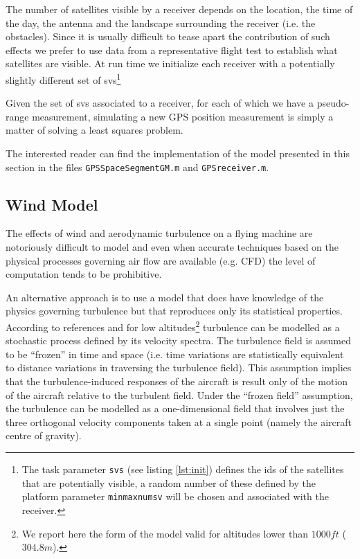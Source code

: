 \documentclass[a4paper,11pt]{report}
\begin{document}
The number of satellites visible by a receiver depends on the location, the time of the day, the antenna and the landscape surrounding the receiver (i.e. the obstacles). Since it is usually difficult to tease apart the contribution of such effects we prefer to use data from a representative flight test to establish what satellites are visible.
At run time we initialize each receiver with a potentially slightly different set of svs\footnote{The task parameter \texttt{svs} (see listing \ref{lst:init}) defines the ids of the satellites that are potentially visible, a random number of these defined by the platform parameter \texttt{minmaxnumsv} will be chosen and associated with the receiver.}

Given the set of svs associated to a receiver, for each of which we have a pseudo-range measurement, simulating a new GPS position measurement is simply a matter of solving a least squares problem. 

The interested reader can find the implementation of the model presented in this section in the files \texttt{GPSSpaceSegmentGM.m} and \texttt{GPSreceiver.m}.  

\subsection{Wind Model}

The effects of wind and aerodynamic turbulence on a flying machine are notoriously difficult to model and even when accurate techniques based on the physical processes governing air flow are available (e.g. CFD) the level of computation tends to be prohibitive.   

An alternative approach is to use a model that does have knowledge of the physics governing turbulence but that reproduces only its statistical properties.
According to references \cite{milf8785c} and \cite{gage2003creating} for low altitudes\footnote{We report here the form of the model valid for altitudes lower than $1000ft$ ($304.8m$).} turbulence can be modelled as a stochastic process defined by its velocity spectra. The turbulence field is assumed to be ``frozen'' in time and space (i.e. time variations are statistically equivalent to distance variations in traversing the turbulence field). This assumption implies that the turbulence-induced responses of the aircraft is result only of the motion of the aircraft relative to the turbulent field.
Under the ``frozen field'' assumption, the turbulence can be modelled as a one-dimensional field that involves just the three orthogonal velocity components taken at a single point (namely the aircraft centre of gravity). 
\end{document}
